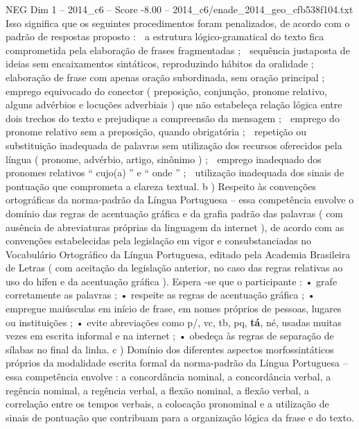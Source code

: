 \begin{textsample}{NEG Dim 1 – 2014\_c6 – Score -8.00 – 2014\_c6/enade\_2014\_geo\_cfb538f104.txt}
Isso significa que os seguintes procedimentos foram penalizados, de acordo com o padrão de respostas proposto :  a estrutura lógico-gramatical do texto fica comprometida pela elaboração de frases fragmentadas ;  sequência justaposta de ideias sem encaixamentos sintáticos, reproduzindo hábitos da oralidade ;  elaboração de frase com apenas oração subordinada, sem oração principal ;  emprego equivocado do conector ( preposição, conjunção, pronome relativo, alguns advérbios e locuções adverbiais ) que não estabeleça relação lógica entre dois trechos do texto e prejudique a compreensão da mensagem ;  emprego do pronome relativo sem a preposição, quando obrigatória ;  repetição ou substituição inadequada de palavras sem utilização dos recursos oferecidos pela língua ( pronome, advérbio, artigo, sinônimo ) ;  emprego inadequado dos pronomes relativos “ cujo(a) ” e “ onde ” ;  utilização inadequada dos sinais de pontuação que comprometa a clareza textual. b ) Respeito às convenções ortográficas da norma-padrão da Língua Portuguesa – essa competência envolve o domínio das regras de acentuação gráfica e da grafia padrão das palavras ( com ausência de abreviaturas próprias da linguagem da internet ), de acordo com as convenções estabelecidas pela legislação em vigor e consubstanciadas no Vocabulário Ortográfico da Língua Portuguesa, editado pela Academia Brasileira de Letras ( com aceitação da legislação anterior, no caso das regras relativas ao uso do hífen e da acentuação gráfica ).
Espera -se que o participante : • grafe corretamente as palavras ; • respeite as regras de acentuação gráfica ; • empregue maiúsculas em início de frase, em nomes próprios de pessoas, lugares ou instituições ; • evite abreviações como p/, vc, tb, pq, \textbf{tá}, né, usadas muitas vezes em escrita informal e na internet ; • obedeça às regras de separação de sílabas no final da linha. c ) Domínio dos diferentes aspectos morfossintáticos próprios da modalidade escrita formal da norma-padrão da Língua Portuguesa – essa competência envolve : a concordância nominal, a concordância verbal, a regência nominal, a regência verbal, a flexão nominal, a flexão verbal, a correlação entre os tempos verbais, a colocação pronominal e a utilização de sinais de pontuação que contribuam para a organização lógica da frase e do texto.

\end{textsample}
